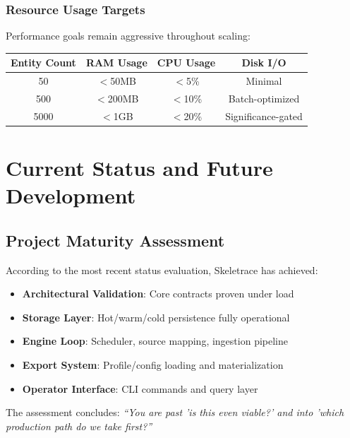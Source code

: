 \documentclass[12pt,a4paper]{article}
\begin{document}
\subsubsection{Resource Usage Targets}
Performance goals remain aggressive throughout scaling:

\begin{center}
\begin{tabular}{|c|c|c|c|}
\hline
\textbf{Entity Count} & \textbf{RAM Usage} & \textbf{CPU Usage} & \textbf{Disk I/O} \\
\hline
50 & $<$50MB & $<$5\% & Minimal \\
500 & $<$200MB & $<$10\% & Batch-optimized \\
5000 & $<$1GB & $<$20\% & Significance-gated \\
\hline
\end{tabular}
\end{center}

\section{Current Status and Future Development}

\subsection{Project Maturity Assessment}

According to the most recent status evaluation, Skeletrace has achieved:

\begin{tcolorbox}[colback=osintgreen!10,colframe=osintgreen,title=Completed Foundation]
\begin{itemize}
\item \textbf{Architectural Validation}: Core contracts proven under load
\item \textbf{Storage Layer}: Hot/warm/cold persistence fully operational
\item \textbf{Engine Loop}: Scheduler, source mapping, ingestion pipeline
\item \textbf{Export System}: Profile/config loading and materialization
\item \textbf{Operator Interface}: CLI commands and query layer
\end{itemize}
\end{tcolorbox}

The assessment concludes: \textit{``You are past 'is this even viable?' and into 'which production path do we take first?''}
\end{document}
